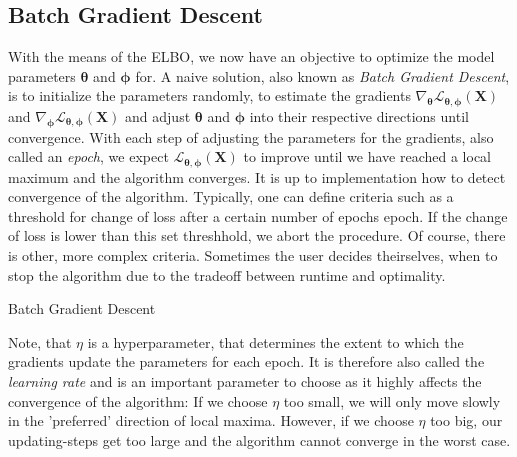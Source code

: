 \documentclass[12pt]{report}
\theoremstyle{definition}
\begin{document}
\subsection{Batch Gradient Descent}
With the means of the ELBO, we now have an objective to optimize the model parameters $\pmb{\theta}$ and $\pmb{\phi}$ for. A naive solution, also known as \emph{Batch Gradient Descent}, is to initialize the parameters randomly, to estimate the gradients $\nabla_{\pmb{\theta}}\mathcal{L}_{\pmb{\theta}, \pmb{\phi}}(\mathbf{X})$ and $\nabla_{\pmb{\pmb{\phi}}}\mathcal{L}_{\pmb{\theta}, \pmb{\phi}}(\mathbf{X})$ and adjust $\pmb{\theta}$ and $\pmb{\phi}$ into their respective directions until convergence. With each step of adjusting the parameters for the gradients, also called an \emph{epoch}, we expect $\mathcal{L}_{\pmb{\theta}, \pmb{\phi}}(\mathbf{X})$ to improve until we have reached a local maximum and the algorithm converges. It is up to implementation how to detect convergence of the algorithm. Typically, one can define criteria such as a threshold for change of loss after a certain number of epochs epoch. If the change of loss is lower than this set threshhold, we abort the procedure. Of course, there is other, more complex criteria. Sometimes the user decides theirselves, when to stop the algorithm due to the tradeoff between runtime and optimality.
\begin{algorithm}[H]
\SetAlgoLined
{}
\caption{Batch Gradient Descent}
\end{algorithm} 
Note, that $\eta$ is a hyperparameter, that determines the extent to which the gradients update the parameters for each epoch. It is therefore also called the \emph{learning rate} and is an important parameter to choose as it highly affects the convergence of the algorithm: If we choose $\eta$ too small, we will only move slowly in the 'preferred' direction of local maxima. However, if we choose $\eta$ too big, our updating-steps get too large and the algorithm cannot converge in the worst case. 
\end{document}
